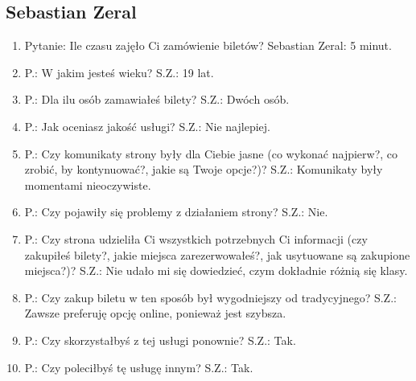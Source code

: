 \documentclass{article}
\begin{document}
\subsection{Sebastian Zeral}
\begin{enumerate}
\item Pytanie: Ile czasu zajęło Ci zamówienie biletów? \newline
Sebastian Zeral: 5 minut.
\item P.: W jakim jesteś wieku? \newline
S.Z.: 19 lat.
\item P.: Dla ilu osób zamawiałeś bilety? \newline
S.Z.: Dwóch osób.
\item P.: Jak oceniasz jakość usługi? \newline
S.Z.: Nie najlepiej.
\item P.: Czy komunikaty strony były dla Ciebie jasne (co wykonać najpierw?, co zrobić, by kontynuować?, jakie są Twoje opcje?)? \newline
S.Z.: Komunikaty były momentami nieoczywiste.
\item P.: Czy pojawiły się problemy z działaniem strony? \newline
S.Z.: Nie.
\item P.: Czy strona udzieliła Ci wszystkich potrzebnych Ci informacji (czy zakupiłeś bilety?, jakie miejsca zarezerwowałeś?, jak usytuowane są zakupione miejsca?)? \newline
S.Z.: Nie udało mi się dowiedzieć, czym dokładnie różnią się klasy.
\item P.: Czy zakup biletu w ten sposób był wygodniejszy od tradycyjnego? \newline
S.Z.: Zawsze preferuję opcję online, ponieważ jest szybsza.
\item P.: Czy skorzystałbyś z tej usługi ponownie? \newline
S.Z.: Tak.
\item P.: Czy poleciłbyś tę usługę innym? \newline
S.Z.: Tak.
\end{enumerate}
\end{document}
